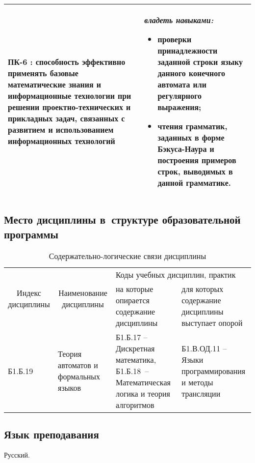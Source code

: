 \documentclass[a4paper,12pt]{article}
\begin{document}
\begin{longtable}{|p{54mm}|p{100mm}|}
  
  \\
  \hline
  ПК-6 : способность эффективно применять базовые математические знания и информационные технологии при решении проектно-технических и прикладных задач, связанных с развитием и использованием информационных технологий
  &
  \emph{владеть навыками:}
  \begin{itemize}[leftmargin=12pt]
    \item проверки принадлежности заданной строки языку данного конечного автомата или регулярного выражения; 
    \item чтения грамматик, заданных в форме Бэкуса-Наура и построения примеров строк, выводимых в данной грамматике. 
  \end{itemize}
  \\
  \hline
  \end{longtable}


\subsection{Место дисциплины в~структуре образовательной программы}

  \begin{table}[H]
  \setlength\arraycolsep{3pt}
  \caption{Содержательно-логические связи дисциплины}
  \begin{tabular}{|l|p{18ex}|*{2}{p{23ex}|}}
  \hline
  \multicolumn{1}{|c|}{\multirow{2}{13ex}{\centering Индекс \linebreak дисциплины}} &
  \multicolumn{1}{c|}{\multirow{2}{18ex}{\centering Наименование \linebreak дисциплины}} & 
  \multicolumn{2}{p{46ex}|}{\centering Коды учебных дисциплин, практик} \\
  \cline{3-4}
   & & 
  \centering на которые опирается содержание дисциплины & 
  \centering\arraybackslash для которых содержание дисциплины выступает опорой
  \\ \hline
  Б1.Б.19 & Теория автоматов и формальных языков 
  & 
  \raggedright
  
  Б1.Б.17 -- Дискретная математика, Б1.Б.18~-- Математическая логика и теория алгоритмов 
  & 
  \raggedright\arraybackslash
  
  Б1.В.ОД.11 -- Языки программирования и методы трансляции 
  \\ \hline
  \end{tabular}
  \end{table}


\subsection{Язык преподавания} 
  Русский.
  
\end{document}
